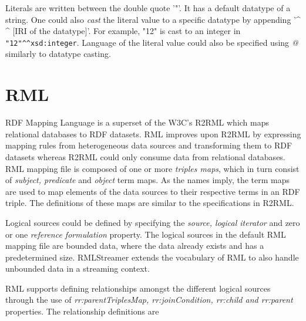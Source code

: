 Literals are written between the double quote '"'. It has a default datatype of 
a string. One could also \textit{cast} the literal value to a specific datatype 
by appending '\textasciicircum{} \textasciicircum{} $[$IRI of the datatype$]$'. For example, 
"12" is cast to an integer in \lstinline{"12"^^xsd:integer}. Language of the literal value 
could also be specified using \textit{@} similarly to datatype casting. 


\section{RML}
RDF Mapping Language\cite{rml} is a superset of the W3C's R2RML\cite{r2rml} which maps relational databases to
RDF datasets. RML improves upon R2RML by expressing mapping rules from heterogeneous
data sources and transforming them to RDF datasets whereas R2RML could only consume
data from relational databases. RML mapping file is composed of one or more \emph{triples maps}, 
which in turn consist of \emph{subject, predicate} and \emph{object} term maps. As the names imply, 
the term maps are used to map elements of the data sources to their respective terms 
in an RDF triple. The definitions of these maps are similar to the 
specifications in R2RML\cite{rml_tech}. 

Logical sources could be defined by specifying the \emph{source, logical iterator} 
and zero or one \emph{reference formulation} property. The logical sources in the default 
RML mapping file are bounded data, where the data already exists and has a predetermined
size. RMLStreamer extends the vocabulary of RML to also handle unbounded data in 
a streaming context. 

RML supports defining relationships amongst the different 
logical sources through the use of \textit{rr:parentTriplesMap, rr:joinCondition, rr:child and rr:parent}
properties. The relationship definitions are


\begin{lstlisting}[caption=An example of a RML mapping file.]
    
    
\end{lstlisting}
